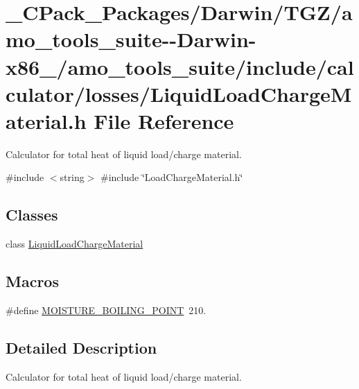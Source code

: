 \hypertarget{___c_pack___packages_2_darwin_2_t_g_z_2amo__tools__suite--_darwin-x86__64_2amo__tools__suite_2ina2aec4a96a46332af7f5f97e8168eb75}{}\section{\+\_\+\+C\+Pack\+\_\+\+Packages/\+Darwin/\+T\+G\+Z/amo\+\_\+tools\+\_\+suite-\/-\/\+Darwin-\/x86\+\_/amo\+\_\+tools\+\_\+suite/include/calculator/losses/\+Liquid\+Load\+Charge\+Material.h File Reference}
\label{___c_pack___packages_2_darwin_2_t_g_z_2amo__tools__suite--_darwin-x86__64_2amo__tools__suite_2ina2aec4a96a46332af7f5f97e8168eb75}


Calculator for total heat of liquid load/charge material.  


{\ttfamily \#include $<$string$>$}\newline
{\ttfamily \#include \char`\"{}Load\+Charge\+Material.\+h\char`\"{}}\newline
\subsection*{Classes}
\begin{DoxyCompactItemize}
\item 
class \hyperlink{class_liquid_load_charge_material}{Liquid\+Load\+Charge\+Material}
\end{DoxyCompactItemize}
\subsection*{Macros}
\begin{DoxyCompactItemize}
\item 
\#define \hyperlink{___c_pack___packages_2_darwin_2_t_g_z_2amo__tools__suite--_darwin-x86__64_2amo__tools__suite_2ina2aec4a96a46332af7f5f97e8168eb75_a8587e8eca9308654712d096366487575}{M\+O\+I\+S\+T\+U\+R\+E\+\_\+\+B\+O\+I\+L\+I\+N\+G\+\_\+\+P\+O\+I\+NT}~210.
\end{DoxyCompactItemize}


\subsection{Detailed Description}
Calculator for total heat of liquid load/charge material. 

